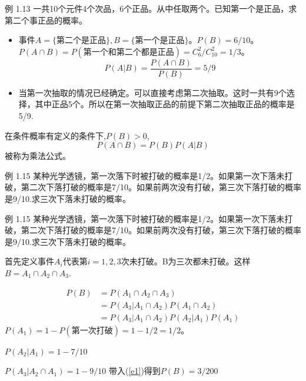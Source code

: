 \documentclass{beamer}
\begin{document}
	\begin{frame}
		例 1.13 一共10个元件4个次品，6个正品。从中任取两个。已知第一个是正品，求第二个事正品的概率。
		
		\begin{itemize}
			\item 事件$A = \{\text{第二个是正品}\}, B = \{\text{第一个是正品}\}$。$P(B) = 6 / 10$。 $P(A\cap B) = P(\text{第一个和第二个都是正品}) = C_6^2 / C_{10}^2 = 1 / 3$。
			\[
			P(A|B) = \frac{P(A\cap B)}{P(B)} = 5 / 9
			\]
			\item 当第一次抽取的情况已经确定。可以直接考虑第二次抽取。这时一共有9个选择，其中正品5个。所以在第一次抽取正品的前提下第二次抽取正品的概率是5/9.
		\end{itemize}
	\end{frame}
	
	\begin{frame}
		在条件概率有定义的条件下,$P(B)>0$,
		\[
		P(A\cap B)= P(B) P(A|B)
		\]
		被称为乘法公式。
	\end{frame}
		
	\begin{frame}
		例 1.15 某种光学透镜，第一次落下时被打破的概率是1/2。如果第一次下落未打破，第二次下落打破的概率是7/10。如果前两次没有打破，第三次下落打破的概率是9/10.求三次下落未打破的概率。
		
	\end{frame}
	
	\begin{frame}
		例 1.15 某种光学透镜，第一次落下时被打破的概率是1/2。如果第一次下落未打破，第二次下落打破的概率是7/10。如果前两次没有打破，第三次下落打破的概率是9/10.求三次下落未打破的概率。
		
		首先定义事件$A_i$代表第$i = 1, 2, 3$次未打破。B为三次都未打破。这样$B =A_1 \cap A_2 \cap A_3$.
		
		\begin{align}
			P(B) &= P( A_1 \cap A_2 \cap A_3) \\
			&= P(A_3 | A_1 \cap A_2) P( A_1 \cap A_2) \\
			&= P(A_3 | A_1 \cap A_2) P( A_2 | A_1) P(A_1) \label{e1}
		\end{align}
		$P(A_1) = 1 - P(\text{第一次打破}) = 1 - 1 / 2 = 1 / 2$。
		
		$P(A_2|A_1) = 1 - 7 / 10$
		
		$P(A_3|A_2 \cap A_1) = 1 - 9 / 10$
		带入(\ref{e1})得到$P(B) = 3 / 200$
	\end{frame}
	
\end{document}
